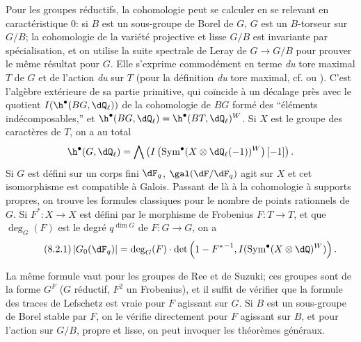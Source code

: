 Pour les groupes réductifs, la cohomologie peut se calculer en se relevant en 
caractéristique $0$: si $B$ est un sous-groupe de Borel de $G$, $G$ est un 
$B$-torseur sur $G/B$; la cohomologie de la variété projective et lisse 
$G/B$ est invariante par spécialisation, et on utilise la suite spectrale de 
Leray de $G\to G/B$ pour prouver le même résultat pour $G$. Elle s'exprime 
commodément en terme \emph{du} tore maximal $T$ de $G$ et de l'action 
\emph{du}  sur $T$ (pour la définition \emph{du} tore 
maximal, cf.  ou \cite[p.105]{dl76}). C'est 
l'algèbre extérieure de sa partie primitive, qui coïncide à un décalage 
près avec le quotient $I(\h^\bullet(B G,\dQ_\ell))$ de la cohomologie de 
$B G$ formé des ``éléments indécomposables,'' et 
$\h^\bullet(B G,\dQ_\ell)=\h^\bullet(B T,\dQ_\ell)^W$. Si $X$ est le groupe des 
caractères de $T$, on a au total 
\[
  \h^\bullet(G,\dQ_\ell) = \bigwedge \left(I\left(\operatorname{Sym}^\bullet(X\otimes \dQ_\ell(-1))^W\right)[-1]\right) \text{.}
\]
Si $G$ est défini sur un corps fini $\dF_q$, $\gal(\dF/\dF_q)$ agit sur $X$ 
et cet isomorphisme est compatible à Galois. Passant de là à la 
cohomologie à supports propres, on trouve les formules classiques pour le 
nombre de points rationnels de $G$. Si $F^\ast:X\to X$ est défini par le 
morphisme de Frobenius $F:T\to T$, et que $\deg_G(F)$ est le degré 
$q^{\dim G}$ de $F:G\to G$, on a 
\begin{equation*}\tag{8.2.1}\label{VI:eq:8-2-1}
  \left|G_0(\dF_q)\right| = \deg_G(F) \cdot \det\left(1-{F^\ast}^{-1},I(\operatorname{Sym}^\bullet(X\otimes \dQ)^W)\right) \text{.}
\end{equation*}

La même formule vaut pour les groupes de Ree et de Suzuki; ces groupes sont 
de la forme $G^F$ ($G$ réductif, $F^2$ un Frobenius), et il suffit de 
vérifier que la formule des traces de Lefschetz est vraie pour $F$ agissant 
sur $G$. Si $B$ est un sous-groupe de Borel stable par $F$, on le vérifie 
directement pour $F$ agissant sur $B$, et pour l'action sur $G/B$, propre et 
lisse, on peut invoquer les théorèmes généraux. 





\subsection{}\label{VI:8-3}

